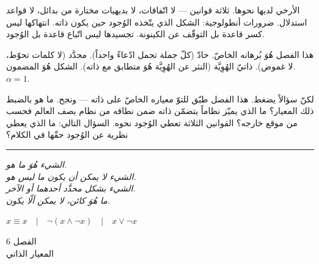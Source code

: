 \documentclass[10pt, openany, oneside]{book}
\renewcommand{\large}{\fontsize{11.5}{14}\selectfont}
\renewcommand{\huge}{\fontsize{17}{21}\selectfont}
\begin{document}
الأرخي لديها نحوها. ثلاثة قوانين --- لا اتّفاقات، لا بديهيات مختارة من بدائل، لا قواعد استدلال. ضرورات أنطولوجية: الشكل الذي يتّخذه الوُجود حين يكون ذاته. انتهاكها ليس كسر قاعدة بل التوقّف عن الكينونة. تجسيدها ليس اتّباع قاعدة بل الوُجود.

هذا الفصل هُوَ بُرهانه الخاصّ. حادّ (كلّ جملة تحمل ادّعاءً واحداً). محدَّد (لا كلمات تحوّط، لا غموض). ذاتيّ الهُوِيَّة (النثر عن الهُوِيَّة هُوَ متطابق مع ذاته). الشكل هُوَ المضمون. $\alpha = 1$.

لكنّ سؤالاً يضغط. هذا الفصل طبّق للتوّ معياره الخاصّ على ذاته --- ونجح. ما هو بالضبط ذلك المعيار؟ ما الذي يميّز نظاماً يتضمّن ذاته ضمن نطاقه من نظام يصف العالم فحسب من موقع خارجه؟ القوانين الثلاثة تعطي الوُجود نحوه. السؤال التالي: ما الذي يعطي نظرية عن الوُجود حقّها في الكلام؟

\vspace{2em}

\begin{center}
    \rule{0.15\textwidth}{0.3pt}
\end{center}

\vspace{0.5em}

\begin{center}
    \itshape
    الشيء هُوَ ما هو.\\
    الشيء لا يمكن أن يكون ما ليس هو.\\
    الشيء بشكل محدَّد أحدهما أو الآخر.\\[0.8em]
    ما هُوَ كائن، لا يمكن ألّا يكون.
\end{center}

\vspace{0.5em}

\begin{center}
    $x \equiv x \quad | \quad \neg(x \wedge \neg x) \quad | \quad x \vee \neg x$
\end{center}

%
%
%

\newpage

\begin{center}
    {\huge الفصل 6}\\[0.3em]
    {\large المعيار الذاتي}
\end{center}
\end{document}
